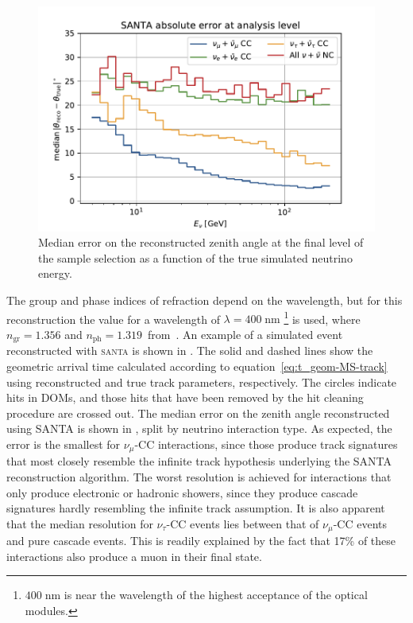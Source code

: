 \begin{figure}
    \centering
    \includegraphics[width=0.8\linewidth]{figures/icecube/reconstruction/santa/santa_absolute_error_final.pdf}
    \caption{Median error on the reconstructed zenith angle at the final level of the sample selection as a function of the true simulated neutrino energy.}
    \label{fig:santa-resolution}
\end{figure}

The group and phase indices of refraction depend on the wavelength, but for this reconstruction the value for a wavelength of $\lambda=400\;\mathrm{nm}$
\footnote{$400\;\mathrm{nm}$ is near the wavelength of the highest acceptance of the optical modules.\cite{icecube_detector_17}} is used, where $n_{\mathrm{gr}}=1.356$ and $n_{\mathrm{ph}}=1.319$~from~.
An example of a simulated event reconstructed with \textsc{santa} is shown in .
The solid and dashed lines show the geometric arrival time calculated according to equation~\ref{eq:t_geom-MS-track} using reconstructed and true track parameters, respectively.
The circles indicate hits in DOMs, and those hits that have been removed by the hit cleaning procedure are crossed out.
The median error on the zenith angle reconstructed using \textsc{SANTA} is shown in , split by neutrino interaction type.
As expected, the error is the smallest for $\nu_\mu$-CC interactions, since those produce track signatures that most closely resemble the infinite track hypothesis underlying the \textsc{SANTA} reconstruction algorithm.
The worst resolution is achieved for interactions that only produce electronic or hadronic showers, since they produce cascade signatures hardly resembling the infinite track assumption.
It is also apparent that the median resolution for $\nu_\tau$-CC events lies between that of $\nu_\mu$-CC events and pure cascade events.
This is readily explained by the fact that 17\% of these interactions also produce a muon in their final state.

